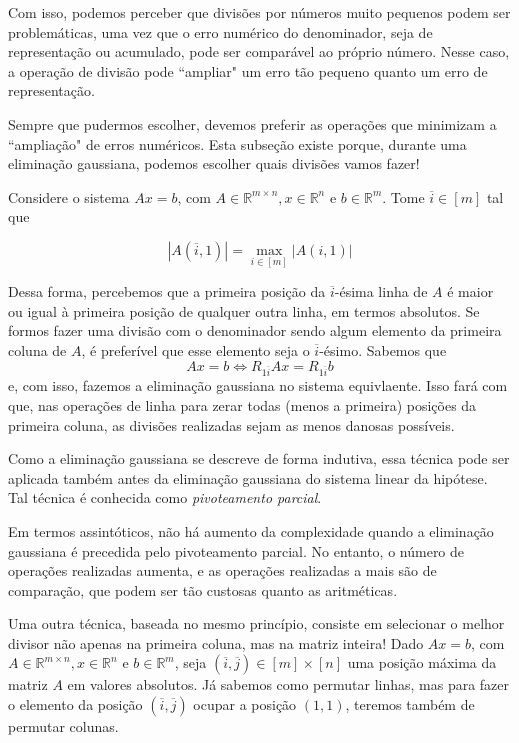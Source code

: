 \documentclass[]{article}
\numberwithin{equation}{section}
\begin{document}
Com isso, podemos perceber que divisões por números muito pequenos podem ser problemáticas, uma vez que o erro numérico do denominador, seja de representação ou acumulado, pode ser comparável ao próprio número. Nesse caso, a operação de divisão pode ``ampliar" um erro tão pequeno quanto um erro de representação.

Sempre que pudermos escolher, devemos preferir as operações que minimizam a ``ampliação" de erros numéricos. Esta subseção existe porque, durante uma eliminação gaussiana, podemos escolher quais divisões vamos fazer!

Considere o sistema $Ax = b$, com $A \in \mathbb{R}^{m \times n}, x \in \mathbb{R}^n$ e $b \in \mathbb{R}^m$. Tome $\overline{i} \in [m]$ tal que

$$
|A(\overline{i}, 1)| = \max_{i \in [m]} |A(i, 1)|
$$

Dessa forma, percebemos que a primeira posição da $\overline{i}$-ésima linha de $A$ é maior ou igual à primeira posição de qualquer outra linha, em termos absolutos. Se formos fazer uma divisão com o denominador sendo algum elemento da primeira coluna de $A$, é preferível que esse elemento seja o $\overline{i}$-ésimo. Sabemos que
$$
Ax = b \iff R_{1\overline{i}}Ax = R_{1\overline{i}}b
$$
e, com isso, fazemos a eliminação gaussiana no sistema equivlaente. Isso fará com que, nas operações de linha para zerar todas (menos a primeira) posições da primeira coluna, as divisões realizadas sejam as menos danosas possíveis.

Como a eliminação gaussiana se descreve de forma indutiva, essa técnica pode ser aplicada também antes da eliminação gaussiana do sistema linear da hipótese. Tal técnica é conhecida como \emph{pivoteamento parcial}.

Em termos assintóticos, não há aumento da complexidade quando a eliminação gaussiana é precedida pelo pivoteamento parcial. No entanto, o  número de operações realizadas aumenta, e as operações realizadas a mais são de comparação, que podem ser tão custosas quanto as aritméticas.

Uma outra técnica, baseada no mesmo princípio, consiste em selecionar o melhor divisor não apenas na primeira coluna, mas na matriz inteira! Dado $Ax = b$, com $A \in \mathbb{R}^{m \times n}, x \in \mathbb{R}^n$ e $b \in \mathbb{R}^m$, seja $(\overline{i}, \overline{j}) \in [m] \times [n]$ uma posição máxima da matriz $A$ em valores absolutos. Já sabemos como permutar linhas, mas para fazer o elemento da posição $(\overline{i}, \overline{j})$ ocupar a posição $(1, 1)$, teremos também de permutar colunas.
\end{document}
